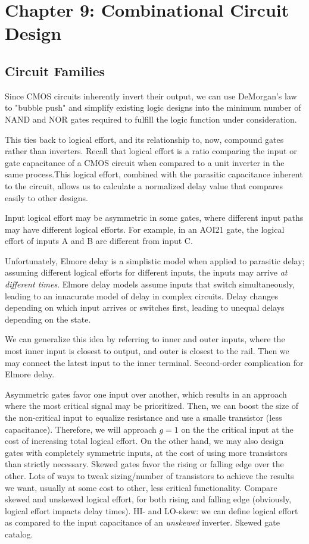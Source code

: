 \documentclass{article}
\begin{document}
\setcounter{section}{8}
\section{Chapter 9: Combinational Circuit Design} 
\setcounter{subsection}{1}
\subsection{Circuit Families}
Since CMOS circuits inherently invert their output, we can use DeMorgan's law to "bubble push" and simplify existing logic designs into the minimum number of NAND and NOR gates required to fulfill the logic function under consideration.

This ties back to logical effort, and its relationship to, now, compound gates rather than inverters. Recall that logical effort is a ratio comparing the input or gate capacitance of a CMOS circuit when compared to a unit inverter in the same process.This logical effort, combined with the parasitic capacitance inherent to the circuit, allows us to calculate a normalized delay value that compares easily to other designs.

Input logical effort may be asymmetric in some gates, where different input paths may have different logical efforts. For example, in an AOI21 gate, the logical effort of inputs A and B are different from input C.

Unfortunately, Elmore delay is a simplistic model when applied to parasitic delay; assuming different logical efforts for different inputs, the inputs may arrive \textit{at different times}. Elmore delay models assume inputs that switch simultaneously, leading to an innacurate model of delay in complex circuits. Delay changes depending on which input arrives or switches first, leading to unequal delays depending on the state.

We can generalize this idea by referring to inner and outer inputs, where the most inner input is closest to output, and outer is closest to the rail. Then we may connect the latest input to the inner terminal. Second-order complication for Elmore delay.

Asymmetric gates favor one input over another, which results in an approach where the most critical signal may be prioritized. Then, we can boost the size of the non-critical input to equalize resistance and use a smalle transistor (less capacitance). Therefore, we will approach \(g=1\) on the the critical input at the cost of increasing total logical effort. On the other hand, we may also design gates with completely symmetric inputs, at the cost of using more transistors than strictly necessary. Skewed gates favor the rising or falling edge over the other. Lots of ways to tweak sizing/number of transistors to achieve the results we want, usually at some cost to other, less critical functionality. Compare skewed and unskewed logical effort, for both rising and falling edge (obviously, logical effort impacts delay times). HI- and LO-skew: we can define logical effort as compared to the input capacitance of an \textit{unskewed} inverter. Skewed gate catalog.
\end{document}

